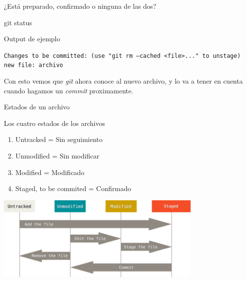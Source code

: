 \begin{frame}[fragile, t]{¿Está preparado, confirmado o ninguna de las dos?}
    \begin{comando}
        git status
    \end{comando}
    \begin{block}{Output de ejemplo}
            \begin{center}
            \texttt{Changes to be committed:
  (use "git rm --cached <file>..." to unstage)
        \\new file:  archivo}
            \end{center}
        \end{block}
   \begin{block}{}
       Con esto vemos que \textit{git} ahora conoce al nuevo archivo, y lo va a tener en cuenta cuando hagamos un \textit{commit} proximamente.
   \end{block}     
\end{frame}

\begin{frame}{Estados de un archivo}

    \begin{block}{Los cuatro estados de los archivos}
            \begin{enumerate}
    \item Untracked = Sin seguimiento
    \item Unmodified = Sin modificar
    \item Modified = Modificado
    \item Staged, to be commited = Confirmado
    \end{enumerate}
    \end{block}
    \begin{center}
        \includegraphics[width=4in]{images/lifecycle.png}
    \end{center}    
\end{frame}

